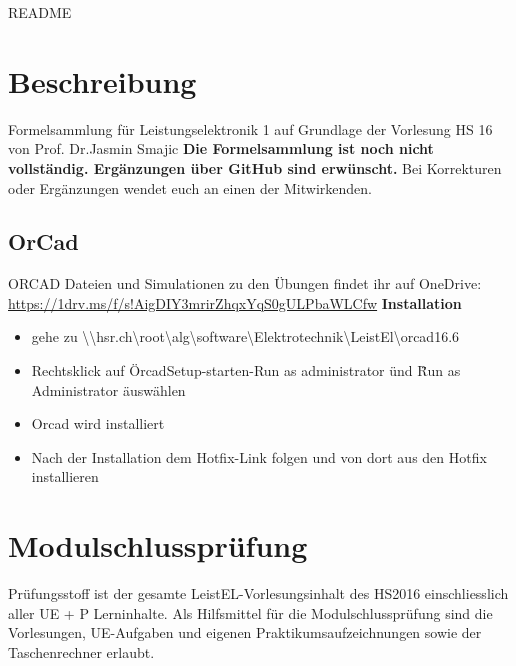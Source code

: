 \thispagestyle{empty}
\setcounter{page}{0} %
{\huge README }
\section*{Beschreibung}
Formelsammlung für Leistungselektronik 1 auf Grundlage der Vorlesung HS 16 von Prof. Dr.Jasmin Smajic \newline
\textbf{Die Formelsammlung ist noch nicht vollständig. Ergänzungen über GitHub sind erwünscht.}\newline
Bei Korrekturen oder Ergänzungen wendet euch an einen der Mitwirkenden.
\subsection*{OrCad}
ORCAD Dateien und Simulationen zu den Übungen findet ihr auf OneDrive: \newline
\url{https://1drv.ms/f/s!AigDIY3mrirZhqxYqS0gULPbaWLCfw}\newline
\textbf{Installation}\newline
\begin{itemize}
    \item gehe zu  \textbackslash\textbackslash hsr.ch\textbackslash root\textbackslash alg\textbackslash software\textbackslash Elektrotechnik\textbackslash LeistEl\textbackslash orcad16.6
    \item Rechtsklick auf \" OrcadSetup-starten-Run as administrator \" und \" Run as Administrator \" auswählen
    \item Orcad wird installiert
    \item Nach der Installation dem Hotfix-Link folgen und von dort aus den Hotfix installieren
\end{itemize}

\section*{Modulschlussprüfung}
Prüfungsstoff ist der gesamte LeistEL-Vorlesungsinhalt des HS2016 einschliesslich aller UE + P Lerninhalte.\newline
Als Hilfsmittel für die Modulschlussprüfung sind die Vorlesungen,\newline
UE-Aufgaben und eigenen Praktikumsaufzeichnungen sowie der Taschenrechner erlaubt.


